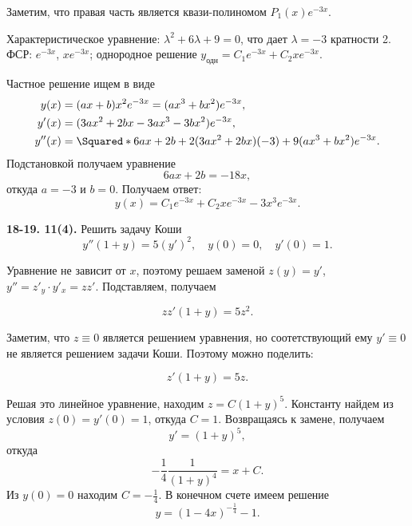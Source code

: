 Заметим, что правая часть является квази-полиномом $P_1(x)e^{-3x}$. 

Характеристическое уравнение: $\lambda^2 + 6 \lambda + 9 = 0$, что дает $\lambda = -3$ кратности 2.
ФСР: $e^{-3x}$, $xe^{-3x}$; однородное решение $y_{\text{одн}} = C_1e^{-3x} + C_2xe^{-3x}$. 

Частное решение ищем в виде
\begin{align*}
    y(x) &= (ax + b)x^2e^{-3x} = (ax^3 + bx^2)e^{-3x}, \\
    y'(x) &= (3ax^2 + 2bx - 3ax^3 - 3bx^2)e^{-3x}, \\
    y''(x) &= \Squared*{6ax + 2b + 2(3ax^2 + 2bx)(-3) + 9(ax^3 + bx^2)}e^{-3x}.
\end{align*}
Подстановкой получаем уравнение
\begin{equation*}
    6ax + 2b = -18x,
\end{equation*}
откуда $a = -3$ и $b = 0$. Получаем ответ:
\begin{equation*}
    y(x) = C_1e^{-3x} + C_2xe^{-3x} - 3x^3e^{-3x}.
\end{equation*}

\begin{task}
    \textbf{18-19. 11(4).} Решить задачу Коши
    \begin{equation*}
        y''(1 + y) = 5(y')^2, \hspace{1em} y(0) = 0, \hspace{1em} y'(0) = 1.
    \end{equation*}
\end{task}

Уравнение не зависит от $x$, поэтому решаем заменой $z(y) = y'$, $y'' = z'_y \cdot y'_x = zz'$. Подставляем, получаем

\begin{equation*}
    zz'(1 + y) =5z^2.
\end{equation*}

Заметим, что $z \equiv 0$ является решением уравнения, но соотетствующий ему $y' \equiv 0$ не является решением задачи Коши. Поэтому можно поделить:

\begin{equation*}
    z'(1 + y) = 5z.
\end{equation*}

Решая это линейное уравнение, находим $z = C(1 + y)^5$. Константу найдем из условия $z(0) = y'(0) = 1$, откуда $C = 1$. Возвращаясь к замене, получаем
\begin{equation*}
    y' = (1 + y)^5,
\end{equation*}
откуда
\begin{equation*}
    -\frac 14 \frac{1}{(1 + y)^4} = x + C.
\end{equation*}
Из $y(0) = 0$ находим $C = -\frac 14$. В конечном счете имеем решение
\begin{equation*}
    y = (1 - 4x)^{-\frac 14} - 1.
\end{equation*}

